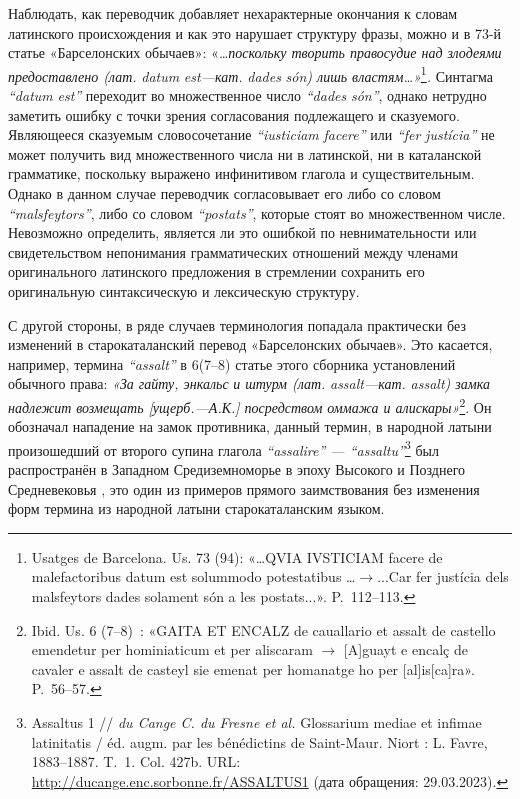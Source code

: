 Наблюдать, как переводчик добавляет нехарактерные окончания к словам латинского происхождения и как это нарушает структуру фразы, можно и в 73-й статье «Барселонских обычаев»: «\emph{…поскольку творить правосудие над злодеями предоставлено (лат.}\emph{ }\emph{datum}\emph{ }\emph{est}\emph{---кат. }\emph{dades}\emph{ }\emph{s}\emph{ó}\emph{n}\emph{) лишь властям…»}\footnote{Usatges de Barcelona. Us. 73 (94): «…QVIA IVSTICIAM facere de malefactoribus datum est solummodo potestatibus …$\rightarrow$...Car fer justícia dels malsfeytors dades solament són a les postats...». P.~112--113.}\emph{.} Синтагма \emph{“}\emph{datum}\emph{ }\emph{est}\emph{”} переходит во множественное число \emph{“}\emph{dades}\emph{ }\emph{s}\emph{ó}\emph{n}\emph{”}, однако нетрудно заметить ошибку с точки зрения согласования подлежащего и сказуемого. Являющееся сказуемым словосочетание \emph{“}\emph{iusticiam}\emph{ }\emph{facere}\emph{” }или \emph{“}\emph{fer}\emph{ }\emph{just}\emph{ícia”} не может получить вид множественного числа ни в латинской, ни в каталанской грамматике, поскольку выражено инфинитивом глагола и существительным. Однако в данном случае переводчик согласовывает его либо со словом \emph{“}\emph{malsfeytors}\emph{”}, либо со словом \emph{“}\emph{postats}\emph{”}, которые стоят во множественном числе. Невозможно определить, является ли это ошибкой по невнимательности или свидетельством непонимания грамматических отношений между членами оригинального латинского предложения в стремлении сохранить его оригинальную синтаксическую и лексическую структуру.

С другой стороны, в ряде случаев терминология попадала практически без изменений в старокаталанский перевод «Барселонских обычаев». Это касается, например, термина \emph{“}\emph{assalt}\emph{”} в 6(7--8) статье этого сборника установлений обычного права:\emph{ «За гайту, энкаль}\emph{с}\emph{ и штурм (лат. }\emph{assalt}\emph{---кат. }\emph{assalt}\emph{) замка надлежит }\emph{возмещать [ущерб.---А.К.] посредством оммажа и алискары»}\footnote{Ibid. Us. 6 (7--8)~: «GAITA ET ENCALZ de cauallario et assalt de castello emendetur per hominiaticum et per aliscaram $\rightarrow$ [A]guayt e encalç de cavaler e assalt de casteyl sie emenat per homanatge ho per [al]is[ca]ra». P.~56--57.}. Он обозначал нападение на замок противника, данный термин, в народной латыни произошедший от второго супина глагола \emph{“}\emph{assalire}\emph{” --- “}\emph{assaltu}\emph{”}\footnote{Assaltus 1 // \emph{d}\emph{u Cange C. du Fresne et al.} Glossarium mediae et infimae latinitatis / éd. augm. par les bénédictins de Saint-Maur. Niort : L. Favre, 1883--1887. T.~1. Col. 427b. URL: \url{http://ducange.enc.sorbonne.fr/ASSALTUS1} (дата обращения: 29.03.2023).} был распространён в Западном Средиземноморье в эпоху Высокого и Позднего Средневековья , это один из примеров прямого заимствования без изменения форм термина из народной латыни старокаталанским языком.

